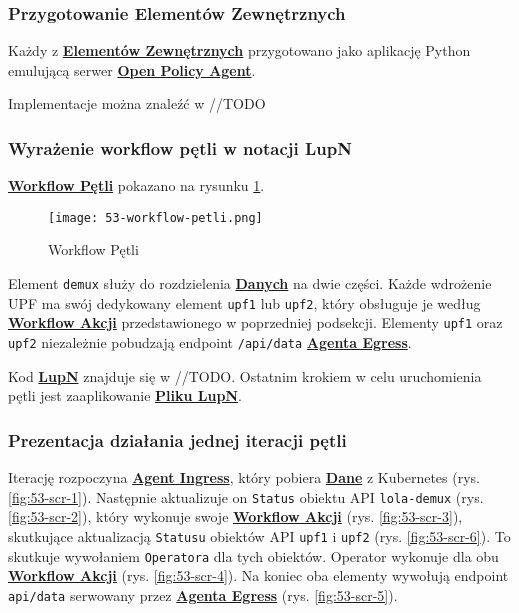 \subsubsection{Przygotowanie Elementów Zewnętrznych}

Każdy z \hyperlink{def:element-zewnetrzny}{\textbf{Elementów Zewnętrznych}} przygotowano jako aplikację Python emulującą serwer \hyperlink{def:opa}{\textbf{Open Policy Agent}}.

Implementacje można znaleźć w //TODO

\subsubsection{Wyrażenie workflow pętli w notacji LupN}

\hyperlink{def:workflow-petli}{\textbf{Workflow Pętli}} pokazano na rysunku \ref{fig:53-workflow-petli}.

\begin{figure}[!h]
    \centering \texttt{[image: 53-workflow-petli.png]}
    \caption{Workflow Pętli}\label{fig:53-workflow-petli}
\end{figure}

Element \texttt{demux} służy do rozdzielenia \hyperlink{def:dane}{\textbf{Danych}} na dwie części. Każde wdrożenie UPF ma swój dedykowany element \texttt{upf1} lub \texttt{upf2}, który obsługuje je według \hyperlink{def:workflow-petli}{\textbf{Workflow Akcji}} przedstawionego w poprzedniej podsekcji. Elementy \texttt{upf1} oraz \texttt{upf2} niezależnie pobudzają endpoint \texttt{/api/data} \hyperlink{def:agent-egress}{\textbf{Agenta Egress}}.

Kod \hyperlink{def:lupn}{\textbf{LupN}} znajduje się w //TODO. Ostatnim krokiem w celu uruchomienia pętli jest zaaplikowanie \hyperlink{def:plik-lupn}{\textbf{Pliku LupN}}.

\subsubsection{Prezentacja działania jednej iteracji pętli}

Iterację rozpoczyna \hyperlink{def:agent-ingress}{\textbf{Agent Ingress}}, który pobiera \hyperlink{def:dane}{\textbf{Dane}} z Kubernetes (rys. \ref{fig:53-scr-1}). Następnie aktualizuje on \texttt{Status} obiektu API \texttt{lola-demux} (rys. \ref{fig:53-scr-2}), który wykonuje swoje \hyperlink{def:workflow-petli}{\textbf{Workflow Akcji}} (rys. \ref{fig:53-scr-3}), skutkujące aktualizacją \texttt{Statusu} obiektów API \texttt{upf1} i \texttt{upf2} (rys. \ref{fig:53-scr-6}). To skutkuje wywołaniem \texttt{Operatora} dla tych obiektów. Operator wykonuje dla obu \hyperlink{def:workflow-petli}{\textbf{Workflow Akcji}} (rys. \ref{fig:53-scr-4}). Na koniec oba elementy wywołują endpoint \texttt{api/data} serwowany przez \hyperlink{def:agent-egress}{\textbf{Agenta Egress}} (rys. \ref{fig:53-scr-5}).


